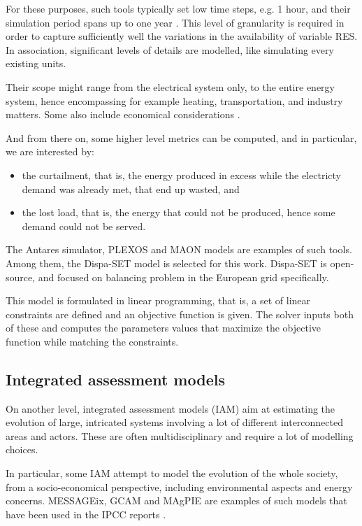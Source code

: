 For these purposes, such tools typically set low time steps, e.g. 1 hour, and their simulation period spans up to one year \cite{short-term-dispatch-1}. This level of granularity is required in order to capture sufficiently well the variations in the availability of variable RES. In association, significant levels of details are modelled, like simulating every existing units. 

Their scope might range from the electrical system only, to the entire energy system, hence encompassing for example heating, transportation, and industry matters. Some also include economical considerations \cite{Antares}.

And from there on, some higher level metrics can be computed, and in particular, we are interested by:
\begin{itemize}
    \item the curtailment, that is, the energy produced in excess while the electricty demand was already met, that end up wasted, and
    \item the lost load, that is, the energy that could not be produced, hence some demand could not be served.
\end{itemize}

The Antares simulator, PLEXOS and MAON models are examples of such tools. Among them, the Dispa-SET model \cite{dispaset} is selected for this work. Dispa-SET is open-source, and focused on balancing problem in the European grid specifically.

This model is formulated in linear programming, that is, a set of linear constraints are defined and an objective function is given. The solver inputs both of these and computes the parameters values that maximize the objective function while matching the constraints.

\subsection{Integrated assessment models}

On another level, integrated assessment models (IAM) aim at estimating the evolution of large, intricated systems involving a lot of different interconnected areas and actors. These are often multidisciplinary and require a lot of modelling choices.

In particular, some IAM attempt to model the evolution of the whole society, from a socio-economical perspective, including environmental aspects and energy concerns. MESSAGEix, GCAM and MAgPIE are examples of such models that have been used in the IPCC reports \cite{GCAM} \cite{MESSAGEix} \cite{Antares} \cite{ipcc-thing}.


